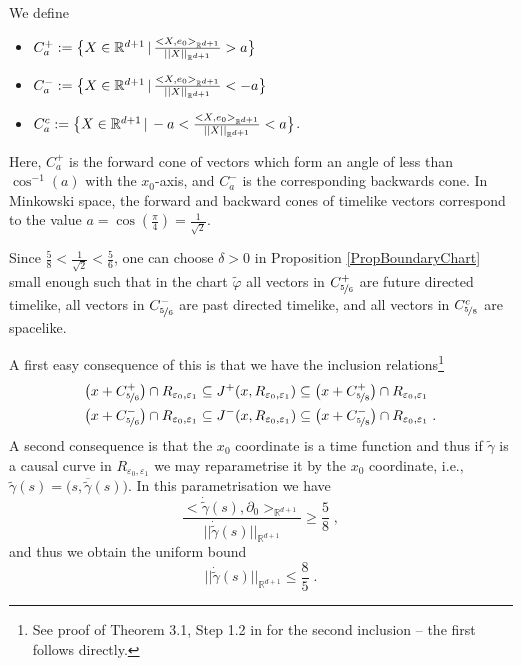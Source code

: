 \documentclass[reqno]{article}
\newcommand{\R}{\mathbb{R}}
\newcommand{\Reps}{R_{\varepsilon_0, \varepsilon_1}}
\begin{document}
We define
\begin{itemize}
\item $C^+_a := \big{\{} X \in \R^{d+1} \, | \, \frac{<X,e_0>_{\R^{d+1}}}{||X||_{\R^{d+1}}}   > a \big{\}}$
\item $C^-_a := \big{\{} X \in \R^{d+1} \, | \, \frac{<X,e_0>_{\R^{d+1}}}{||X||_{\R^{d+1}}}   < -a \big{\}}$
\item $C^c_a := \big{\{} X \in \R^{d+1} \, | \, -a < \frac{<X,e_0>_{\R^{d+1}}}{||X||_{\R^{d+1}}}   < a \big{\}}$\;.
\end{itemize}
Here, $C^+_a$ is the forward cone of vectors which form an angle of less than $\cos^{-1}(a)$ with the $x_0$-axis, and $C^-_a$ is the corresponding backwards cone. In Minkowski space, the forward and backward cones of timelike vectors correspond to the value $a = \cos(\frac{\pi}{4}) = \frac{1}{\sqrt{2}}$.

Since $\frac{5}{8} < \frac{1}{\sqrt{2}} < \frac{5}{6}$, one can choose $\delta >0$ in Proposition \ref{PropBoundaryChart} small enough such that in the chart $\tilde{\varphi}$  all vectors in $C^+_{\nicefrac{5}{6}}$ are future directed timelike, all vectors in $C^-_{\nicefrac{5}{6}}$ are past directed timelike, and all vectors in $C^c_{\nicefrac{5}{8}}$ are spacelike.

A first easy consequence of this is that we have the inclusion relations\footnote{See proof of Theorem 3.1, Step 1.2 in \cite{Sbie15} for the second inclusion -- the first follows directly.} 
\begin{equation}\label{EqInclusionRelationFuture}
\begin{split}
&\big( x + C^+_{\nicefrac{5}{6}}\big) \cap  \Reps \subseteq J^+(x, \Reps) \subseteq \big( x + C^+_{\nicefrac{5}{8}}\big) \cap  \Reps \\
&\big( x + C^-_{\nicefrac{5}{6}}\big) \cap  \Reps \subseteq J^-(x, \Reps) \subseteq \big( x + C^-_{\nicefrac{5}{8}}\big) \cap  \Reps  \;.
\end{split}
\end{equation}
A second consequence is that the $x_0$ coordinate is a time function  and thus if $\tilde{\gamma}$ is a causal curve in $R_{\varepsilon_0, \varepsilon_1}$ we may reparametrise it by the $x_0$ coordinate, i.e., $\tilde{\gamma}(s) = \big(s, \overline{\tilde{\gamma}}(s)\big)$. In this parametrisation we have $$\frac{<\dot{\tilde{\gamma}}(s), \partial_0>_{\R^{d+1}}}{||\dot{\tilde{\gamma}}(s)||_{\R^{d+1}}} \geq \frac{5}{8} \;,$$
and thus we obtain the uniform bound 
\begin{equation}\label{EqUniformBoundCausalCurve}
||\dot{\tilde{\gamma}}(s)||_{\R^{d+1}} \leq \frac{8}{5}\;.
\end{equation}
\end{document}
